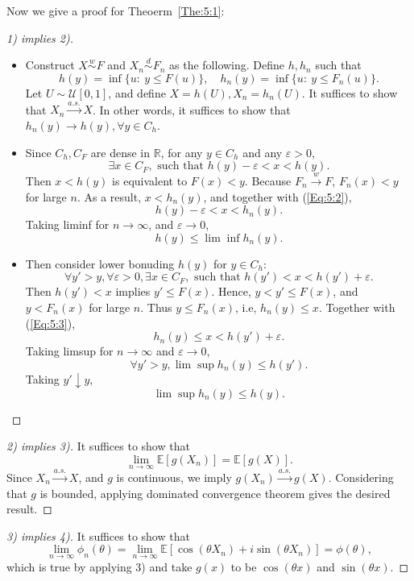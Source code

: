 Now we give a proof for Theoerm~\ref{The:5:1}:
\begin{proof}[1) implies 2)]
\begin{itemize}
\item
Construct $X\overset{w}{\sim}F$ and $X_n\overset{d}{\sim}F_n$ as the following.
Define $h,h_n$ such that 
\[
h(y)=\inf\{u:~y\le F(u)\},\quad h_n(y)=\inf\{u:~y\le F_n(u)\}.
\]
Let $U\sim\mathcal{U}[0,1]$, and define $X=h(U),X_n=h_n(U)$.
It suffices to show that $X_n\xrightarrow{a.s.}X$.
In other words, it suffices to show that $h_n(y)\to h(y),\forall y\in C_h$.
\item
Since $C_h,C_F$ are dense in $\mathbb{R}$, for any $y\in C_h$ and any $\varepsilon>0$,
\begin{equation}\label{Eq:5:2}
\exists x\in C_F,\text{ such that }h(y)-\varepsilon<x<h(y).
\end{equation}
Then $x<h(y)$ is equivalent to $F(x)<y$. Because $F_n\xrightarrow{w}F$, $F_n(x)<y$ for large $n$.
As a result, $x<h_n(y)$, and together with (\ref{Eq:5:2}),
\[
h(y)-\varepsilon<x<h_n(y).
\]
Taking liminf for $n\to\infty$, and $\varepsilon\to0$, 
\[
h(y)\le\lim\inf h_n(y).
\]
\item
Then consider lower bonuding $h(y)$ for $y\in C_h$:
\begin{equation}\label{Eq:5:3}
\forall y'>y,\forall\varepsilon>0,\exists x\in C_F,\text{ such that }h(y')<x<h(y')+\varepsilon.
\end{equation}
Then $h(y')<x$ implies $y'\le F(x)$. Hence, $y<y'\le F(x)$, and $y<F_n(x)$ for large $n$.
Thus $y\le F_n(x)$, i.e, $h_n(y)\le x$. Together with (\ref{Eq:5:3}),
\[
h_n(y)\le x<h(y')+\varepsilon.
\]
Taking limsup for $n\to\infty$ and $\varepsilon\to0$,
\[
\forall y'>y, \lim\sup h_n(y)\le h(y').
\]
Taking $y'\downarrow y$,
\[
\lim\sup h_n(y)\le h(y).
\]
\end{itemize}
\end{proof}

\begin{proof}[2) implies 3)]
It suffices to show that
\[
\lim_{n\to\infty}\mathbb{E}[g(X_n)] = \mathbb{E}[g(X)].
\]
Since $X_n\xrightarrow{a.s.}X$, and $g$ is continuous, we imply
$g(X_n)\xrightarrow{a.s.}g(X)$.
Considering that $g$ is bounded, applying dominated convergence theorem gives the desired result.
\end{proof}

\begin{proof}[3) implies 4)]
It suffices to show that
\[
\lim_{n\to\infty}\phi_n(\theta) = \lim_{n\to\infty}\mathbb{E}[\cos(\theta X_n) + i\sin(\theta X_n)]=\phi(\theta),
\]
which is true by applying 3) and take $g(x)$ to be $\cos(\theta x)$ and $\sin(\theta x)$.
\end{proof}


